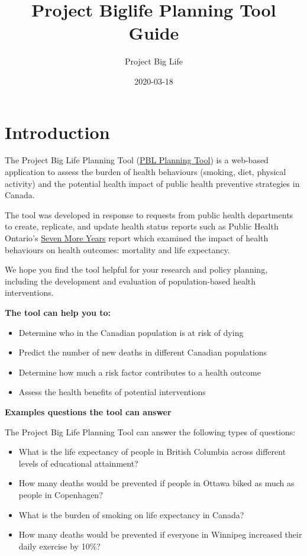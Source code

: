\documentclass[]{book}
\title{Project Biglife Planning Tool Guide}
\author{Project Big Life}
\date{2020-03-18}
\providecommand{\tightlist}{%
  \setlength{\itemsep}{0pt}\setlength{\parskip}{0pt}}
\begin{document}
\maketitle

{
\setcounter{tocdepth}{1}
\tableofcontents
}
\chapter{Introduction}\label{introduction}

The Project Big Life Planning Tool
(\href{http://planning.projectbiglife.ca/}{PBL Planning Tool}) is a
web-based application to assess the burden of health behaviours
(smoking, diet, physical activity) and the potential health impact of
public health preventive strategies in Canada.

The tool was developed in response to requests from public health
departments to create, replicate, and update health status reports such
as Public Health Ontario's
\href{https://www.ices.on.ca/Publications/Atlases-and-Reports/2012/Seven-More-Years}{Seven
More Years} report which examined the impact of health behaviours on
health outcomes: mortality and life expectancy.

We hope you find the tool helpful for your research and policy planning,
including the development and evaluation of population-based health
interventions.

\textbf{The tool can help you to:}

\begin{itemize}
\tightlist
\item
  Determine who in the Canadian population is at risk of dying
\item
  Predict the number of new deaths in different Canadian populations
\item
  Determine how much a risk factor contributes to a health outcome
\item
  Assess the health benefits of potential interventions
\end{itemize}

\textbf{Examples questions the tool can answer}

The Project Big Life Planning Tool can answer the following types of
questions:

\begin{itemize}
\tightlist
\item
  What is the life expectancy of people in British Columbia across
  different levels of educational attainment?
\item
  How many deaths would be prevented if people in Ottawa biked as much
  as people in Copenhagen?
\item
  What is the burden of smoking on life expectancy in Canada?
\item
  How many deaths would be prevented if everyone in Winnipeg increased
  their daily exercise by 10\%?
\end{itemize}
\end{document}
